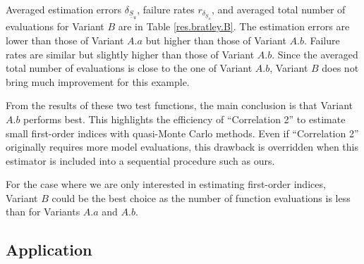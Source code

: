 Averaged estimation errors $\delta_{\underline{S}_u}$, failure rates $r_{\delta_{\underline{S}_u}}$, and averaged total number of evaluations for Variant $B$ are  in Table \ref{res.bratley.B}. The estimation errors are lower than those of Variant $A.a$ but higher than those of Variant $A.b$. Failure rates are similar but slightly higher than those of Variant $A.b$. Since the averaged total number of evaluations is close to the one of Variant $A.b$,  Variant $B$ does not bring much improvement for this example.
\bigskip

From the results of these two test functions, the main conclusion is that Variant $A.b$ performs best. This highlights the efficiency of ``Correlation 2'' to estimate small first-order indices with quasi-Monte Carlo methods. Even if ``Correlation 2'' originally requires more model evaluations, this drawback is overridden when this estimator is included into a sequential procedure such as ours. 

For the case where we are only interested in estimating first-order indices, Variant $B$ could be the best choice as the number of function evaluations is less than for Variants $A.a$ and $A.b$.

\subsection{Application}
\label{sec:5.2}

